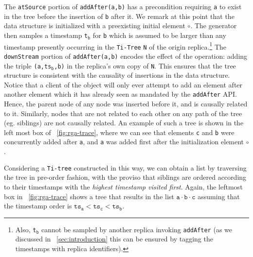 The \lstinline|atSource| portion of \lstinline|addAfter(a,b)| has
a precondition requiring \lstinline|a| to exist in the tree before the
insertion of \lstinline|b| after it.
%
We remark at this point that the data structure is initialized with a
preexisting initial element $\circ$.
%
The generator then samples a timestamp \lstinline|t|$_{\mathtt{b}}$
for \lstinline|b| which is assumed to be larger than any
timestamp presently occurring in the \lstinline|Ti-Tree|
\lstinline|N| of the origin replica.\footnote{Also, \lstinline|t|$_{\mathtt{b}}$ cannot 
be sampled by another replica invoking \lstinline|addAfter| (as we discussed
in \sectionautorefname~\ref{sec:introduction} this can be ensured by tagging the timestamps with replica identifiers).}
%
The \lstinline|downStream| portion of \lstinline|addAfter(a,b)|
encodes the effect of the operation: adding the triple
\lstinline|(a,ts|$_{\mathtt{b}}$\lstinline|,b)| in the replica's own
copy of \lstinline|N|.
%
This ensures that the tree structure is consistent with the causality
of insertions in the data structure.
%
Notice that a client of the object will only ever attempt to add an
element after another element which it has already seen as mandated by
the \lstinline|addAfter| API.
%
Hence, the parent node of any node was inserted before it, and is
causally related to it.
%
Similarly, nodes that are not related to each other on any path of
the tree (eg. siblings) are not causally related.
%
An example of such a tree is shown in the left most box
of \figureautorefname~\ref{fig:rga-trace}, where we can see that
elements \lstinline|c| and \lstinline|b| were concurrently added after
\lstinline|a|, and \lstinline|a| was added first after the
initialization element $\circ$.

Considering a \lstinline|Ti-tree| constructed in this way, we can
obtain a list by traversing the tree in pre-order fashion, with the
proviso that siblings are ordered according to their timestamps with
the \emph{highest timestamp visited first}.
%
Again, the leftmost box in \figureautorefname~\ref{fig:rga-trace} shows a tree that
results in the list $\mathtt{a \cdot b \cdot c}$ assuming that the
timestamp order is $\mathtt{ts_a < ts_c < ts_b}$.

